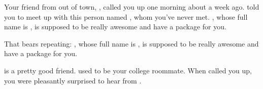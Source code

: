 \documentclass[char]{guildcamp3}
\begin{document}
\name{\cPoliTwo{}}

\updatemacro{\cNPC}{
  \unknownplayer %
  }





Your friend from out of town, \cSomeGuy{\intro}, called you up one
morning about a week ago.  \cSomeGuy{} told you to meet up with this
person named \cNPC{}, whom you've never met.  \cNPC{}, whose full name
is \cNPC{\intro}, is supposed to be really awesome and have a package
for you.

That bears repeating: \cNPC{\nick{\informal}}, whose full name is
\cNPC{\full}, is supposed to be really awesome and have a package for
you.

\cSomeGuy{} is a pretty good friend.  \cSomeGuy{\They} used to be your
college roommate.  When \cSomeGuy{\they} called you up, you were
pleasantly surprised to hear from \cSomeGuy{\them}.
\end{document}
